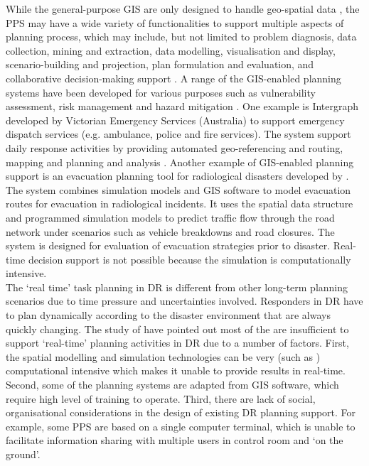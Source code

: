 While the general-purpose GIS  are only designed to handle geo-spatial data \cite{Geertman2004}, the PPS may have a wide variety of functionalities to support multiple aspects of planning process, which may include, but not limited to problem diagnosis, data collection, mining and extraction, data modelling, visualisation and display, scenario-building and projection, plan formulation and evaluation, and collaborative decision-making support \cite{Geertman2004,Zerger2003}. A range of the GIS-enabled planning systems have been developed for various purposes such as  vulnerability assessment, risk management and hazard mitigation\cite{Cova1999} . One example is Intergraph developed by Victorian Emergency Services (Australia) \cite{IntergraphCorporation2000}to support emergency dispatch services (e.g. ambulance, police and fire services). The system support daily response activities by providing automated geo-referencing and routing, mapping and planning and analysis \cite{Zerger2003}. Another example of GIS-enabled planning support is an evacuation planning tool for radiological disasters developed by \cite{Eglese1994}. The system combines simulation models and  GIS software to model evacuation routes for evacuation in radiological incidents.  It uses the spatial data structure and programmed simulation models to predict traffic flow through the road network under scenarios such as vehicle breakdowns and road closures. The system is designed for evaluation of evacuation strategies prior to disaster. Real-time decision support is not possible because the simulation is computationally intensive.\\

The `real time' task planning in DR is different from other long-term planning scenarios due to time pressure and uncertainties involved.  Responders in DR have to plan dynamically according to the disaster environment that are always quickly changing. The study of \cite{Zerger2003} have pointed out most of the are insufficient to support `real-time' planning activities in DR due to a number of factors. First, the spatial modelling and simulation technologies can be very (such as \cite{Eglese1994} ) computational intensive which makes it unable to provide results in real-time. Second, some of the planning systems are adapted from GIS software, which require high level of training to operate. Third, there are lack of social, organisational considerations in the design of existing DR planning support. For example, some PPS are based on a single computer terminal, which is unable to facilitate information sharing with multiple users in control room and `on the ground'. \\

